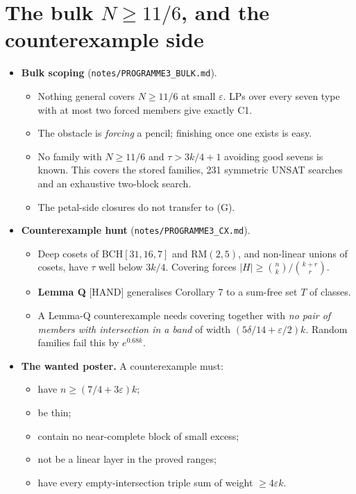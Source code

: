 \documentclass[11pt]{article}
\newcommand{\lvl}[1]{\textsf{\small[#1]}}
\begin{document}
\section{The bulk $N\ge11/6$, and the counterexample side}
\begin{itemize}
\item \textbf{Bulk scoping} (\texttt{notes/PROGRAMME3\_BULK.md}).
  \begin{itemize}
  \item Nothing general covers $N\ge11/6$ at small $\varepsilon$. LPs over every seven type with at most two forced members
  give exactly C1.
  \item The obstacle is \emph{forcing} a pencil; finishing once one exists is easy.
  \item No family with $N\ge11/6$ and $\tau>3k/4+1$ avoiding good sevens is known. This covers the stored families, 231
  symmetric UNSAT searches and an exhaustive two-block search.
  \item The petal-side closures do not transfer to (G).
  \end{itemize}
\item \textbf{Counterexample hunt} (\texttt{notes/PROGRAMME3\_CX.md}).
  \begin{itemize}
  \item Deep cosets of BCH$[31,16,7]$ and RM$(2,5)$, and non-linear unions of cosets, have $\tau$ well below $3k/4$. Covering
  forces $|H|\ge\binom nk/\binom{k+r}r$.
  \item \textbf{Lemma Q} \lvl{HAND} generalises Corollary 7 to a sum-free set $T$ of classes.
  \item A Lemma-Q counterexample needs covering together with \emph{no pair of members with intersection in a band} of width
  $(5\delta/14+\varepsilon/2)k$. Random families fail this by $e^{0.68k}$.
  \end{itemize}
\item \textbf{The wanted poster.} A counterexample must:
  \begin{itemize}
  \item have $n\ge(7/4+3\varepsilon)k$;
  \item be thin;
  \item contain no near-complete block of small excess;
  \item not be a linear layer in the proved ranges;
  \item have every empty-intersection triple sum of weight $\ge4\varepsilon k$.
  \end{itemize}
\end{itemize}
\end{document}
